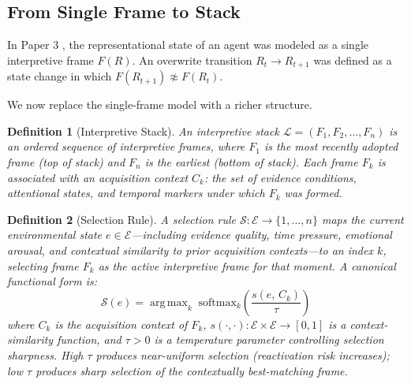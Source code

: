 \documentclass[12pt]{article}
\newtheorem{definition}{Definition}
\begin{document}
\subsection{From Single Frame to Stack}

In Paper 3 \cite{minamoto2026overwrite}, the representational state
of an agent was modeled as a single interpretive frame $F(R)$.
An overwrite transition $R_t \to R_{t+1}$ was defined as a state
change in which $F(R_{t+1}) \not\approx F(R_t)$.

We now replace the single-frame model with a richer structure.

\begin{definition}[Interpretive Stack]
An interpretive stack $\mathcal{L} = (F_1, F_2, \ldots, F_n)$ is
an ordered sequence of interpretive frames, where $F_1$ is the
most recently adopted frame (top of stack) and $F_n$ is the
earliest (bottom of stack).
Each frame $F_k$ is associated with an \emph{acquisition context}
$C_k$: the set of evidence conditions, attentional states, and
temporal markers under which $F_k$ was formed.
\end{definition}

\begin{definition}[Selection Rule]
A selection rule $\mathcal{S} : \mathcal{E} \to \{1, \ldots, n\}$
maps the current environmental state $e \in \mathcal{E}$---including
evidence quality, time pressure, emotional arousal, and contextual
similarity to prior acquisition contexts---to an index $k$,
selecting frame $F_k$ as the active interpretive frame for that
moment.
A canonical functional form is:
\[
\mathcal{S}(e) = \operatorname{arg\,max}_k\;
\mathrm{softmax}_k\!\left(\frac{s(e,\, C_k)}{\tau}\right)
\]
where $C_k$ is the acquisition context of $F_k$,
$s(\cdot,\cdot): \mathcal{E} \times \mathcal{E} \to [0,1]$ is a context-similarity function,
and $\tau > 0$ is a temperature parameter controlling selection sharpness.
High $\tau$ produces near-uniform selection (reactivation risk increases);
low $\tau$ produces sharp selection of the contextually best-matching frame.
\end{definition}
\end{document}
